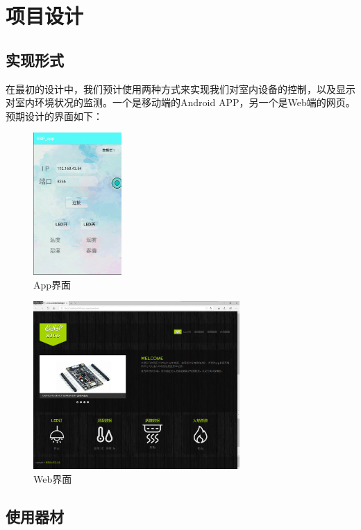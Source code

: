 
\chapter{项目设计}
\section{实现形式}

在最初的设计中，我们预计使用两种方式来实现我们对室内设备的控制，以及显示对室内环境状况的监测。一个是移动端的Android APP，另一个是Web端的网页。预期设计的界面如下：

\begin{figure}[htbp]
\centering
\includegraphics[width=0.3\textwidth]{figures/app_UI}
\caption{App界面}\label{fig:1}
\end{figure}

\begin{figure}[htbp]
\centering
\includegraphics[width=0.7\textwidth]{figures/web_UI}
\caption{Web界面}\label{fig:2}
\end{figure}

\section{使用器材}

